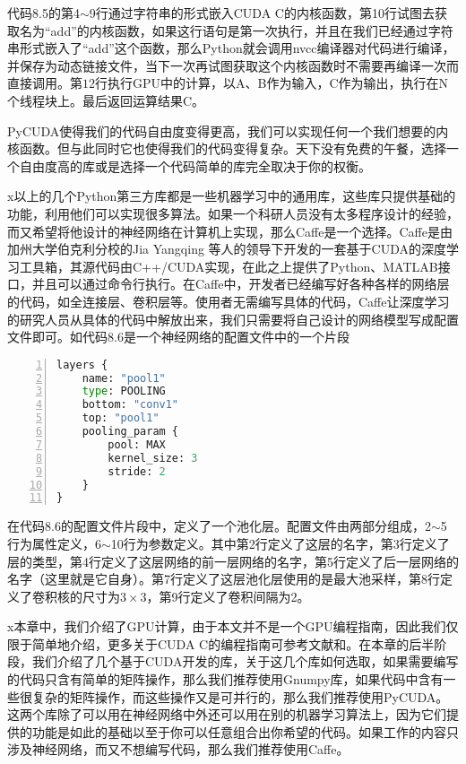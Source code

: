 代码8.5的第4$\sim$9行通过字符串的形式嵌入CUDA C的内核函数，第10行试图去获取名为“add”的内核函数，如果这行语句是第一次执行，并且在我们已经通过字符串形式嵌入了“add”这个函数，那么Python就会调用nvcc编译器对代码进行编译，并保存为动态链接文件，当下一次再试图获取这个内核函数时不需要再编译一次而直接调用。第$12$行执行GPU中的计算，以A、B作为输入，C作为输出，执行在N个线程块上。最后返回运算结果C。

PyCUDA使得我们的代码自由度变得更高，我们可以实现任何一个我们想要的内核函数。但与此同时它也使得我们的代码变得复杂。天下没有免费的午餐，选择一个自由度高的库或是选择一个代码简单的库完全取决于你的权衡。

x以上的几个Python第三方库都是一些机器学习中的通用库，这些库只提供基础的功能，利用他们可以实现很多算法。如果一个科研人员没有太多程序设计的经验，而又希望将他设计的神经网络在计算机上实现，那么Caffe是一个选择。Caffe是由加州大学伯克利分校的Jia Yangqing 等人的领导下开发的一套基于CUDA的深度学习工具箱，其源代码由C++/CUDA实现，在此之上提供了Python、MATLAB接口，并且可以通过命令行执行。在Caffe中，开发者已经编写好各种各样的网络层的代码，如全连接层、卷积层等。使用者无需编写具体的代码，Caffe让深度学习的研究人员从具体的代码中解放出来，我们只需要将自己设计的网络模型写成配置文件即可。如代码8.6是一个神经网络的配置文件中的一个片段

\begin{lstlisting}[language=Python,numbers=left, frame=shadowbox, rulesepcolor=\color{cadegrey}, caption=\text{神经网络配置文件片段}]
layers {
    name: "pool1"
    type: POOLING
    bottom: "conv1"
    top: "pool1"
    pooling_param {
        pool: MAX
        kernel_size: 3
        stride: 2
    }
}
\end{lstlisting}

在代码8.6的配置文件片段中，定义了一个池化层。配置文件由两部分组成，2$\sim$5行为属性定义，6$\sim$10行为参数定义。其中第2行定义了这层的名字，第3行定义了层的类型，第4行定义了这层网络的前一层网络的名字，第5行定义了后一层网络的名字（这里就是它自身）。第7行定义了这层池化层使用的是最大池采样，第8行定义了卷积核的尺寸为$3\times 3$，第9行定义了卷积间隔为2。



x本章中，我们介绍了GPU计算，由于本文并不是一个GPU编程指南，因此我们仅限于简单地介绍，更多关于CUDA C的编程指南可参考文献\cite{CUDA}和\cite{CUDAcode}。在本章的后半阶段，我们介绍了几个基于CUDA开发的库，关于这几个库如何选取，如果需要编写的代码只含有简单的矩阵操作，那么我们推荐使用Gnumpy库，如果代码中含有一些很复杂的矩阵操作，而这些操作又是可并行的，那么我们推荐使用PyCUDA。这两个库除了可以用在神经网络中外还可以用在别的机器学习算法上，因为它们提供的功能是如此的基础以至于你可以任意组合出你希望的代码。如果工作的内容只涉及神经网络，而又不想编写代码，那么我们推荐使用Caffe。



